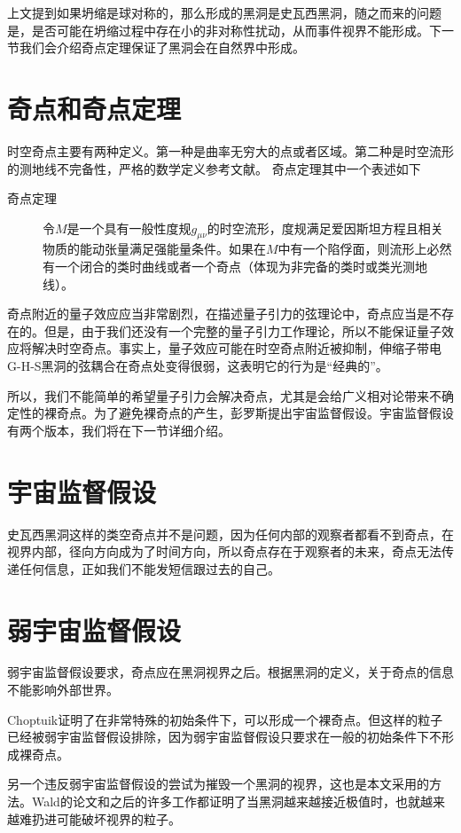 上文提到如果坍缩是球对称的，那么形成的黑洞是史瓦西黑洞，随之而来的问题是，是否可能在坍缩过程中存在小的非对称性扰动，从而事件视界不能形成。下一节我们会介绍奇点定理保证了黑洞会在自然界中形成。

\section{奇点和奇点定理}
时空奇点主要有两种定义。第一种是曲率无穷大的点或者区域。第二种是时空流形的测地线不完备性，严格的数学定义参考文献\citep{penrose1999question}。
奇点定理其中一个表述如下\citep{陈斌2018广义相对论}

\begin{description}
    \item[奇点定理]  令$M$是一个具有一般性度规$g_{\mu \nu}$的时空流形，度规满足爱因斯坦方程且相关物质的能动张量满足强能量条件。如果在$M$中有一个陷俘面，则流形上必然有一个闭合的类时曲线或者一个奇点（体现为非完备的类时或类光测地线）。
\end{description}

奇点附近的量子效应应当非常剧烈，在描述量子引力的弦理论中，奇点应当是不存在的。但是，由于我们还没有一个完整的量子引力工作理论，所以不能保证量子效应将解决时空奇点。事实上，量子效应可能在时空奇点附近被抑制，伸缩子带电G-H-S黑洞的弦耦合在奇点处变得很弱，这表明它的行为是“经典的”\citep{ong2020space}。

所以，我们不能简单的希望量子引力会解决奇点，尤其是会给广义相对论带来不确定性的裸奇点。为了避免裸奇点的产生，彭罗斯提出宇宙监督假设。宇宙监督假设有两个版本，我们将在下一节详细介绍。

\section{宇宙监督假设}
史瓦西黑洞这样的类空奇点并不是问题，因为任何内部的观察者都看不到奇点，在视界内部，径向方向成为了时间方向，所以奇点存在于观察者的未来，奇点无法传递任何信息，正如我们不能发短信跟过去的自己。
\section{弱宇宙监督假设}
弱宇宙监督假设要求，奇点应在黑洞视界之后。根据黑洞的定义，关于奇点的信息不能影响外部世界。

Choptuik证明了在非常特殊的初始条件下\citep{choptuik1993universality}，可以形成一个裸奇点。但这样的粒子已经被弱宇宙监督假设排除，因为弱宇宙监督假设只要求在一般的初始条件下不形成裸奇点。

另一个违反弱宇宙监督假设的尝试为摧毁一个黑洞的视界，这也是本文采用的方法。Wald的论文\citep{wald1974gedanken}和之后的许多工作都证明了当黑洞越来越接近极值时，也就越来越难扔进可能破坏视界的粒子。

